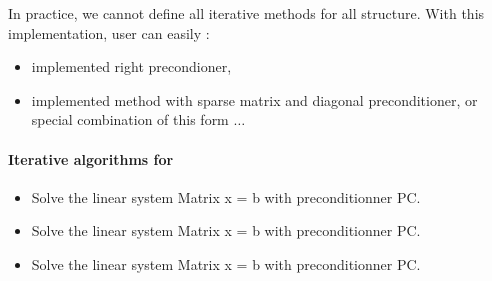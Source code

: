 In practice, we cannot define all iterative methods for all structure.
With this implementation, user can easily :
\begin{itemize}
\item implemented right precondioner, 
\item implemented method with sparse matrix and diagonal preconditioner, or
  special combination of this form $\dots$
\end{itemize}


\paragraph{Iterative algorithms for }


\begin{itemize}
\item {}
  \sshortdescribe Solve the linear system Matrix x = b with preconditionner PC.  
\item {}
  \sshortdescribe Solve the linear system Matrix x = b with preconditionner PC.  
\item {}
  \sshortdescribe Solve the linear system Matrix x = b with preconditionner PC.
\end{itemize}



